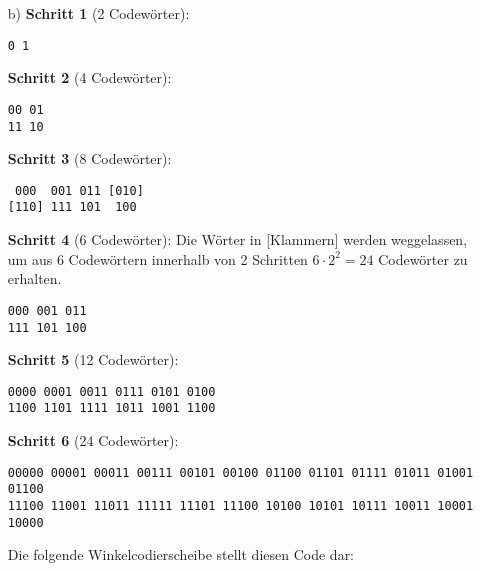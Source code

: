 \documentclass[a4paper,10pt]{scrartcl}
\begin{document}
\begin{enumerate}
\begin{enumerate}
            \item[b)]
                \textbf{Schritt 1} (2 Codewörter): \begin{verbatim}
0 1
                \end{verbatim}

                \textbf{Schritt 2} (4 Codewörter): \begin{verbatim}
00 01
11 10
                \end{verbatim}

                \textbf{Schritt 3} (8 Codewörter): \begin{verbatim}
 000  001 011 [010]
[110] 111 101  100
                \end{verbatim}

                \textbf{Schritt 4} (6 Codewörter): Die Wörter in [Klammern] werden weggelassen, um aus $6$ Codewörtern innerhalb von 2 Schritten $6 \cdot 2^2 = 24$
                Codewörter zu erhalten.

                \begin{verbatim}
000 001 011
111 101 100
                \end{verbatim}

                \textbf{Schritt 5} (12 Codewörter): \begin{verbatim}
0000 0001 0011 0111 0101 0100
1100 1101 1111 1011 1001 1100
                \end{verbatim}

                \textbf{Schritt 6} (24 Codewörter): \begin{verbatim}
00000 00001 00011 00111 00101 00100 01100 01101 01111 01011 01001 01100
11100 11001 11011 11111 11101 11100 10100 10101 10111 10011 10001 10000
                \end{verbatim}

                \newpage

                Die folgende Winkelcodierscheibe stellt diesen Code dar:
                \begin{figure}[!h]
                    \centering
\end{figure}
\end{enumerate}
\end{enumerate}
\end{document}
